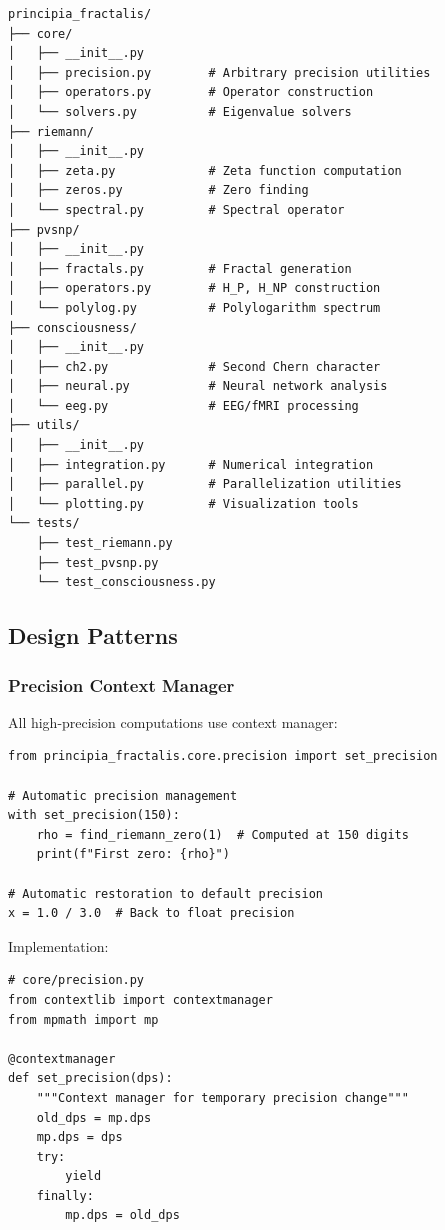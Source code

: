 \begin{verbatim}
principia_fractalis/
├── core/
│   ├── __init__.py
│   ├── precision.py        # Arbitrary precision utilities
│   ├── operators.py        # Operator construction
│   └── solvers.py          # Eigenvalue solvers
├── riemann/
│   ├── __init__.py
│   ├── zeta.py             # Zeta function computation
│   ├── zeros.py            # Zero finding
│   └── spectral.py         # Spectral operator
├── pvsnp/
│   ├── __init__.py
│   ├── fractals.py         # Fractal generation
│   ├── operators.py        # H_P, H_NP construction
│   └── polylog.py          # Polylogarithm spectrum
├── consciousness/
│   ├── __init__.py
│   ├── ch2.py              # Second Chern character
│   ├── neural.py           # Neural network analysis
│   └── eeg.py              # EEG/fMRI processing
├── utils/
│   ├── __init__.py
│   ├── integration.py      # Numerical integration
│   ├── parallel.py         # Parallelization utilities
│   └── plotting.py         # Visualization tools
└── tests/
    ├── test_riemann.py
    ├── test_pvsnp.py
    └── test_consciousness.py
\end{verbatim}

\subsection{Design Patterns}

\subsubsection{Precision Context Manager}

All high-precision computations use context manager:

\begin{verbatim}
from principia_fractalis.core.precision import set_precision

# Automatic precision management
with set_precision(150):
    rho = find_riemann_zero(1)  # Computed at 150 digits
    print(f"First zero: {rho}")

# Automatic restoration to default precision
x = 1.0 / 3.0  # Back to float precision
\end{verbatim}

Implementation:
\begin{verbatim}
# core/precision.py
from contextlib import contextmanager
from mpmath import mp

@contextmanager
def set_precision(dps):
    """Context manager for temporary precision change"""
    old_dps = mp.dps
    mp.dps = dps
    try:
        yield
    finally:
        mp.dps = old_dps
\end{verbatim}

